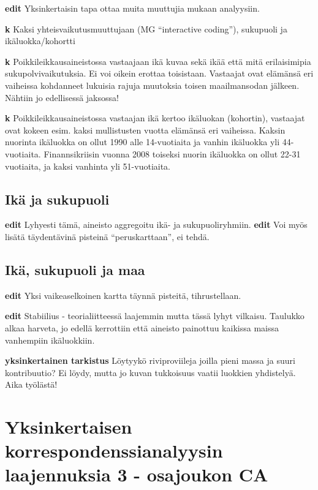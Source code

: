 \documentclass[
  finnish,
]{book}
\begin{document}
\textbf{edit} Yksinkertaisin tapa ottaa muita muuttujia mukaan analyysiin.

\textbf{k} Kaksi yhteisvaikutusmuuttujaan (MG ``interactive coding''), sukupuoli ja
ikäluokka/kohortti

\textbf{k} Poikkileikkausaineistossa vastaajaan ikä kuvaa sekä ikää että mitä erilaisimipia
sukupolvivaikutuksia. Ei voi oikein erottaa toisistaan. Vastaajat ovat elämänsä eri
vaiheissa kohdanneet lukuisia rajuja muutoksia toisen maailmansodan jälkeen. Nähtiin
jo edellisessä jaksossa!

\textbf{k} Poikkileikkausaineistossa vastaajan ikä kertoo ikäluokan (kohortin), vastaajat ovat
kokeen esim. kaksi mullistusten vuotta elämänsä eri vaiheissa. Kaksin nuorinta ikäluokka
on ollut 1990 alle 14-vuotiaita ja vanhin ikäluokka yli 44-vuotiaita. Finannsikriisin
vuonna 2008 toiseksi nuorin ikäluokka on ollut 22-31 vuotiaita, ja kaksi vanhinta
yli 51-vuotiaita.

\hypertarget{ikuxe4-ja-sukupuoli}{%
\section{Ikä ja sukupuoli}\label{ikuxe4-ja-sukupuoli}}

\textbf{edit} Lyhyesti tämä, aineisto aggregoitu ikä- ja sukupuoliryhmiin.
\textbf{edit} Voi myös lisätä täydentävinä pisteinä ``peruskarttaan'', ei tehdä.

\hypertarget{ikuxe4-sukupuoli-ja-maa}{%
\section{Ikä, sukupuoli ja maa}\label{ikuxe4-sukupuoli-ja-maa}}

\textbf{edit} Yksi vaikeaselkoinen kartta täynnä pisteitä, tihrustellaan.

\textbf{edit} Stabiilius - teorialiitteessä laajemmin mutta tässä lyhyt vilkaisu.
Taulukko alkaa harveta, jo edellä kerrottiin että aineisto painottuu kaikissa maissa
vanhempiin ikäluokkiin.

\textbf{yksinkertainen tarkistus} Löytyykö riviproviileja joilla pieni massa ja suuri
kontribuutio? Ei löydy, mutta jo kuvan tukkoisuus vaatii luokkien yhdistelyä.
Aika työlästä!

\hypertarget{yksinkertaisen-korrespondenssianalyysin-laajennuksia-3---osajoukon-ca}{%
\chapter{Yksinkertaisen korrespondenssianalyysin laajennuksia 3 - osajoukon CA}\label{yksinkertaisen-korrespondenssianalyysin-laajennuksia-3---osajoukon-ca}}
\end{document}
